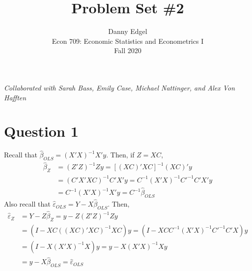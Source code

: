 \documentclass{article}
\newcommand{\bols}{\hat{\beta}_{OLS}}
\newcommand{\bhat}{\hat{\beta}}
\newcommand{\vols}{\hat{\varepsilon}_{OLS}}
\begin{document}
\title{	Problem Set \#2 }
\author{ 	Danny Edgel 										\\ 
			Econ 709: Economic Statistics and Econometrics I	\\
			Fall 2020											\\
		}
\maketitle\thispagestyle{empty}


\noindent\textit{Collaborated with Sarah Bass, Emily Case, Michael Nattinger, and Alex Von Hafften}


\section*{Question 1}
Recall that ${\bols=(X'X)^{-1}X'y}$. Then, if ${Z=XC}$,
\begin{align*}
	\bhat_Z &= (Z'Z)^{-1}Zy = \left[(XC)'XC\right]^{-1}(XC)'y	\\
			&= \left(C'X'XC\right)^{-1}C'X'y = C^{-1}(X'X)^{-1}C'^{-1}C'X'y \\
			&= C^{-1}(X'X)^{-1}X'y = C^{-1}\bols
\end{align*}
Also recall that ${\vols = Y-X\bols}$. Then,
\begin{align*}
	\hat{\varepsilon}_Z &= Y-Z\bhat_Z = y - Z(Z'Z)^{-1}Zy 		\\
						&= \left(I - XC((XC)'XC)^{-1}XC\right)y = \left(I - XCC^{-1}(X'X)^{-1}C'^{-1}C'X\right)y	\\
						&= \left(I - X(X'X)^{-1}X\right)y = y - X(X'X)^{-1}Xy	\\
						&= y - X\bols = \vols
\end{align*}


\end{document}
